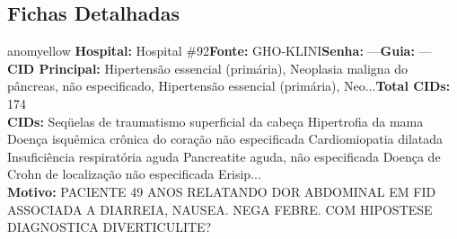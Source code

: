\documentclass[a4paper,10pt]{article}
\begin{document}
\subsection{Fichas Detalhadas}
\begin{anomalycard}[Interna\c{c}\~{a}o \#402 | Pac. \#514 | MODERADO (z=2.87) | LOS: 11d | 12/03/2026\,$\to$\,—]{anomyellow}
\textbf{Hospital:} Hospital \#92\quad \textbf{Fonte:} GHO-KLINI\quad \textbf{Senha:} ---\quad \textbf{Guia:} ---\\

\textbf{CID Principal:} {\small Hipertensão essencial (primária), Neoplasia maligna do pâncreas, não especificado, Hipertensão essencial (primária), Neo...}\quad\textbf{Total CIDs:} 174\\

\textbf{CIDs:} {\scriptsize Seqüelas de traumatismo superficial da cabeça \textbar{} Hipertrofia da mama \textbar{} Doença isquêmica crônica do coração não especificada \textbar{} Cardiomiopatia dilatada \textbar{} Insuficiência respiratória aguda \textbar{} Pancreatite aguda, não especificada \textbar{} Doença de Crohn de localização não especificada \textbar{} Erisip...}\\

\textbf{Motivo:} {\scriptsize PACIENTE 49 ANOS RELATANDO DOR ABDOMINAL EM FID ASSOCIADA A DIARREIA, NAUSEA. NEGA FEBRE. COM HIPOSTESE DIAGNOSTICA DIVERTICULITE?}\\

\end{anomalycard}
\end{document}
